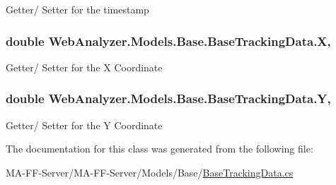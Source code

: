 Getter/ Setter for the timestamp 

\hypertarget{class_web_analyzer_1_1_models_1_1_base_1_1_base_tracking_data_a579bb7898a92e60f4f26cf8a5cbfa46f}{}
\subsubsection[{X}]{\setlength{\rightskip}{0pt plus 5cm}double Web\+Analyzer.\+Models.\+Base.\+Base\+Tracking\+Data.\+X\hspace{0.3cm}{\ttfamily [get]}, {\ttfamily [set]}}\label{class_web_analyzer_1_1_models_1_1_base_1_1_base_tracking_data_a579bb7898a92e60f4f26cf8a5cbfa46f}


Getter/ Setter for the X Coordinate 

\hypertarget{class_web_analyzer_1_1_models_1_1_base_1_1_base_tracking_data_ad885c1d6a4adb3f61a09b49d6e1550e7}{}
\subsubsection[{Y}]{\setlength{\rightskip}{0pt plus 5cm}double Web\+Analyzer.\+Models.\+Base.\+Base\+Tracking\+Data.\+Y\hspace{0.3cm}{\ttfamily [get]}, {\ttfamily [set]}}\label{class_web_analyzer_1_1_models_1_1_base_1_1_base_tracking_data_ad885c1d6a4adb3f61a09b49d6e1550e7}


Getter/ Setter for the Y Coordinate 



The documentation for this class was generated from the following file\+:\begin{DoxyCompactItemize}
\item 
M\+A-\/\+F\+F-\/\+Server/\+M\+A-\/\+F\+F-\/\+Server/\+Models/\+Base/\hyperlink{_base_tracking_data_8cs}{Base\+Tracking\+Data.\+cs}\end{DoxyCompactItemize}
